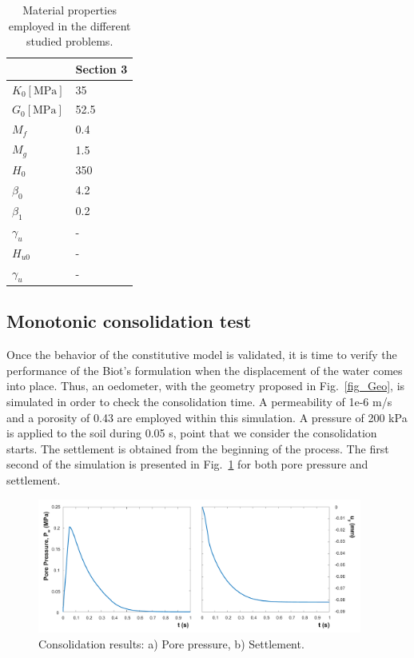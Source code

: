\documentclass[preprint,12pt,a4paper]{elsarticle}
\begin{document}
\begin{table}
\caption{\label{tab3} Material properties employed in the different studied problems.} 
\centering
	\begin{tabular}{l|l}
	& Section 3 \\
	\hline
        $K_{0} \left[ \text{MPa} \right]$  & 35
        \\ 
        $G_{0} \left[ \text{MPa} \right]$ & 52.5
        \\
        \(M_{f}\)  & 0.4
        \\
        \(M_{g}\) & 1.5
        \\
        \(H_{0}\) & 350
        \\
        \(\beta_{0}\) & 4.2
        \\
        \(\beta_{1}\) & 0.2
        \\
        \( \gamma_{u}\)  & -
        \\
        \(H_{u 0}\) & -
        \\
        \( \gamma_{u}\)  & -
        \\
	\end{tabular}
\end{table}

\subsection{Monotonic consolidation test}
\label{sec:32}
Once the behavior of the constitutive model is validated, it is time to verify the performance of the Biot's formulation when the displacement of the water comes into place. Thus, an oedometer, with the geometry proposed in Fig.~\ref{fig_Geo}, is simulated in order to check the consolidation time. A permeability of 1e-6 m/s and a porosity of 0.43 are employed within this simulation. A pressure of 200 kPa is applied to the soil during 0.05 s, point that we consider the consolidation starts. The settlement is obtained from the beginning of the process. The first second of the simulation is presented in Fig.~\ref{fig_conso} for both pore pressure and settlement.
\begin{figure}
\centering
\includegraphics[width=0.95\textwidth]{Figs/conso.pdf}
\caption{Consolidation results: a) Pore pressure, b) Settlement.}
\label{fig_conso}
\end{figure}
\end{document}
